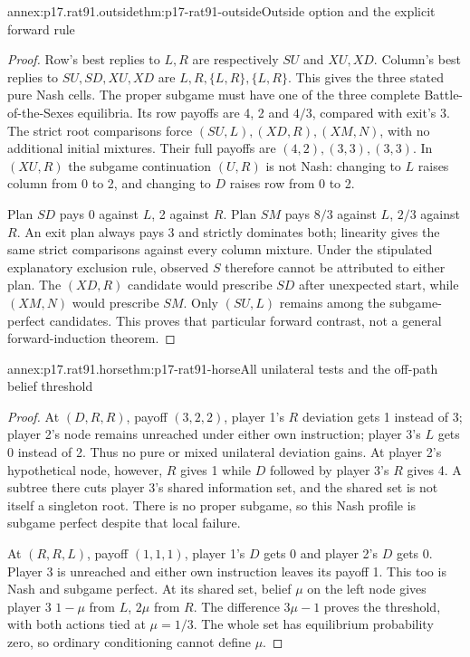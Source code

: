 \begin{annexitem}{annex:p17.rat91.outside}{thm:p17-rat91-outside}{Outside option and the explicit forward rule}
\begin{proof}
Row's best replies to \(L,R\) are respectively \(SU\)
and \(XU,XD\). Column's best replies to
\(SU,SD,XU,XD\) are \(L,R,\{L,R\},\{L,R\}\).
This gives the three stated pure Nash cells.
The proper subgame must have one of the three complete
Battle-of-the-Sexes equilibria. Its row payoffs are
4, 2 and \(4/3\), compared with exit's 3. The strict
root comparisons force \((SU,L),(XD,R),(XM,N)\),
with no additional initial mixtures. Their full payoffs
are \((4,2),(3,3),(3,3)\). In \((XU,R)\) the
subgame continuation \((U,R)\) is not Nash: changing
to \(L\) raises column from 0 to 2, and changing
to \(D\) raises row from 0 to 2.

Plan \(SD\) pays 0 against \(L\), 2 against \(R\).
Plan \(SM\) pays \(8/3\) against \(L\), \(2/3\)
against \(R\). An exit plan always pays 3 and strictly
dominates both; linearity gives the same strict comparisons
against every column mixture. Under the stipulated explanatory
exclusion rule, observed \(S\) therefore cannot be attributed
to either plan. The \((XD,R)\) candidate would prescribe
\(SD\) after unexpected start, while \((XM,N)\) would
prescribe \(SM\). Only \((SU,L)\) remains among the
subgame-perfect candidates. This proves that particular
forward contrast, not a general forward-induction theorem.
\end{proof}
\end{annexitem}

\begin{annexitem}{annex:p17.rat91.horse}{thm:p17-rat91-horse}{All unilateral tests and the off-path belief threshold}
\begin{proof}
At \((D,R,R)\), payoff \((3,2,2)\), player 1's
\(R\) deviation gets 1 instead of 3; player 2's
node remains unreached under either own instruction;
player 3's \(L\) gets 0 instead of 2. Thus no pure
or mixed unilateral deviation gains. At player 2's
hypothetical node, however, \(R\) gives 1 while
\(D\) followed by player 3's \(R\) gives 4.
A subtree there cuts player 3's shared information set,
and the shared set is not itself a singleton root.
There is no proper subgame, so this Nash profile is
subgame perfect despite that local failure.

At \((R,R,L)\), payoff \((1,1,1)\), player 1's
\(D\) gets 0 and player 2's \(D\) gets 0.
Player 3 is unreached and either own instruction leaves
its payoff 1. This too is Nash and subgame perfect.
At its shared set, belief \(\mu\) on the left node
gives player 3 \(1-\mu\) from \(L\), \(2\mu\)
from \(R\). The difference \(3\mu-1\) proves the
threshold, with both actions tied at \(\mu=1/3\).
The whole set has equilibrium probability zero, so
ordinary conditioning cannot define \(\mu\).
\end{proof}
\end{annexitem}

